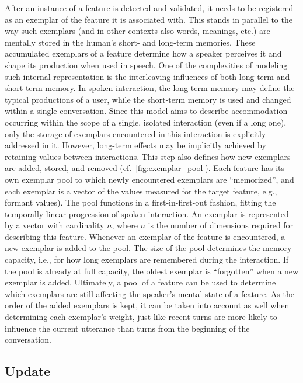 After an instance of a feature is detected and validated, it needs to be registered as an exemplar of the feature it is associated with.
This stands in parallel to the way such exemplars (and in other contexts also words, meanings, etc.) are mentally stored in the human's short- and long-term memories.
These accumulated exemplars of a feature determine how a speaker perceives it and shape its production when used in speech.
One of the complexities of modeling such internal representation is the interleaving influences of both long-term and short-term memory.
In spoken interaction, the long-term memory may define the typical productions of a user, while the short-term memory is used and changed within a single conversation.
Since this model aims to describe accommodation occurring within the scope of a single, isolated interaction (even if a long one), only the storage of exemplars encountered in this interaction is explicitly addressed in it.
However, long-term effects may be implicitly achieved by retaining values between interactions.
This step also defines how new exemplars are added, stored, and removed (cf.\ \cref{fig:exemplar_pool}).
Each feature has its own exemplar pool to which newly encountered exemplars are \enquote{memorized}, and each exemplar is a vector of the values measured for the target feature, e.g., formant values).
The pool functions in a first-in-first-out fashion, fitting the temporally linear progression of spoken interaction.
An exemplar is represented by a vector with cardinality $n$, where $n$ is the number of dimensions required for describing this feature.
Whenever an exemplar of the feature is encountered, a new exemplar is added to the pool.
The size of the pool determines the memory capacity, i.e., for how long exemplars are remembered during the interaction.
If the pool is already at full capacity, the oldest exemplar is \enquote{forgotten} when a new exemplar is added.
Ultimately, a pool of a feature can be used to determine which exemplars are still affecting the speaker's mental state of a feature.
As the order of the added exemplars is kept, it can be taken into account as well when determining each exemplar's weight, just like recent turns are more likely to influence the current utterance than turns from the beginning of the conversation.

\subsection{Update}
\label{subsec:update}

